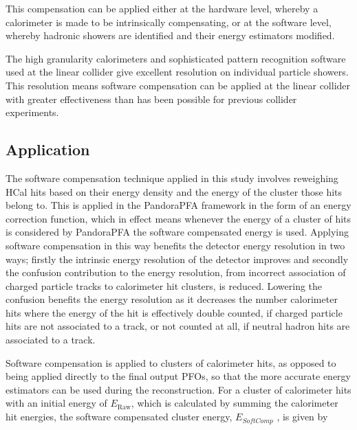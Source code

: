 \begin{figure}
\label{fig:softcompeventdisplay}
\end{figure}

This compensation can be applied either at the hardware level, whereby a calorimeter is made to be intrinsically compensating, or at the software level, whereby hadronic showers are identified and their energy estimators modified.  

The high granularity calorimeters and sophisticated pattern recognition software used at the linear collider give excellent resolution on individual particle showers.  This resolution means software compensation can be applied at the linear collider with greater effectiveness than has been possible for previous collider experiments.  


\subsection{Application}
The software compensation technique applied in this study involves reweighing HCal \text{ } hits based on their energy density and the energy of the cluster those hits belong to.  This is applied in the PandoraPFA framework in the form of an energy correction function, which in effect means whenever the energy of a cluster of hits is considered by PandoraPFA the software compensated energy is used.  Applying software compensation in this way benefits the detector energy resolution in two ways; firstly the intrinsic energy resolution of the detector improves and secondly the confusion contribution to the energy resolution, from incorrect association of charged particle tracks to calorimeter hit clusters, is reduced.  Lowering the confusion benefits the energy resolution as it decreases the number calorimeter hits where the energy of the hit is effectively double counted, if charged particle hits are not associated to a track, or not counted at all, if neutral hadron hits are associated to a track.   

Software compensation is applied to clusters of calorimeter hits, as opposed to being applied directly to the final output PFOs, so that the more accurate energy estimators can be used during the reconstruction.  For a cluster of calorimeter hits with an initial energy of $E_{\text{Raw}}$, which is  calculated by summing the calorimeter hit energies, the software compensated cluster energy, $E_{SoftComp}$ \cite{Adloff:2012gv}, is given by 

